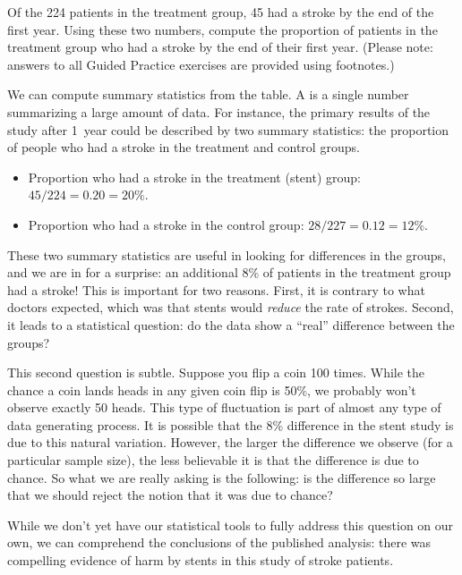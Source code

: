 \begin{exercisewrap}
\begin{nexercise}
Of the 224 patients in the treatment group, 45 had a stroke by the end of the first year. Using these two numbers, compute the proportion of patients in the treatment group who had a stroke by the end of their first year. (Please note: answers to all Guided Practice exercises are provided using footnotes.)\footnotemark
\end{nexercise}
\end{exercisewrap}

We can compute summary statistics from the table.
A %
is a single number summarizing
a large amount of data.
For instance, the primary results of the study after 1~year
could be described by two summary statistics:
the proportion of people who had a stroke in the treatment
and control groups.
\begin{itemize}
\setlength{\itemsep}{0mm}
\item[] Proportion who had a stroke in the treatment (stent) group: $45/224 = 0.20 = 20\%$.
\item[] Proportion who had a stroke in the control group: $28/227 = 0.12 = 12\%$.
\end{itemize}
These two summary statistics are useful in looking for differences in the groups, and we are in for a surprise: an additional 8\% of patients in the treatment group had a stroke! This is important for two reasons. First, it is contrary to what doctors expected, which was that stents would \emph{reduce} the rate of strokes. Second, it leads to a statistical question: do the data show a ``real'' difference between the groups?

This second question is subtle. Suppose you flip a coin 100 times. While the chance a coin lands heads in any given coin flip is 50\%, we probably won't observe exactly 50 heads. This type of fluctuation is part of almost any type of data generating process. It is possible that the 8\% difference in the stent study is due to this natural variation. However, the larger the difference we observe (for a particular sample size), the less believable it is that the difference is due to chance. So what we are really asking is the following: is the difference so large that we should reject the notion that it was due to chance?

While we don't yet have our statistical tools to fully address this question on our own, we can comprehend the conclusions of the published analysis: there was compelling evidence of harm by stents in this study of stroke patients.

